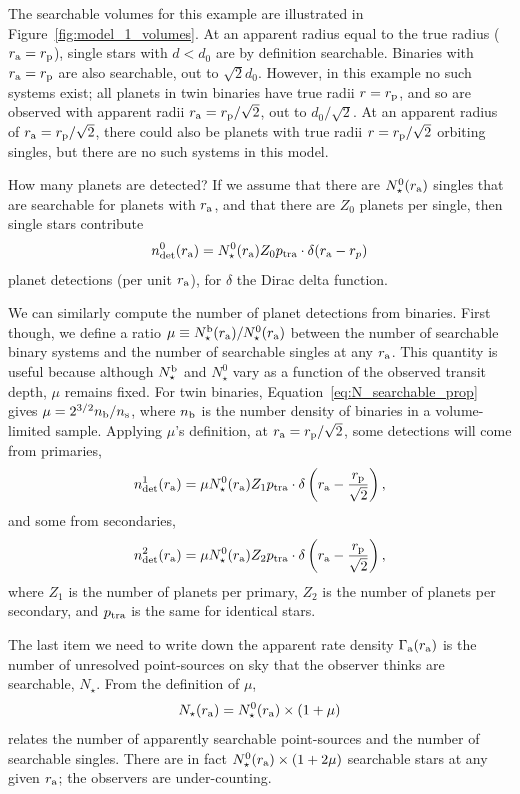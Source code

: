 \documentclass[12pt,modern]{aastex61}
\renewcommand{\a}{_{\rm a}}
\newcommand{\p}{_{\rm p}}
\begin{document}
The searchable volumes for this example are illustrated in
Figure~\ref{fig:model_1_volumes}.  At an apparent radius equal to the
true radius ($r\a=r\p$), single stars with $d<d_0$ are by definition
searchable.  Binaries with $r\a=r\p$ are also searchable, out to
$\sqrt{2}d_0$.  However, in this example no such systems exist; all
planets in twin binaries have true radii $r=r\p$, and so are observed
with apparent radii $r\a=r\p/\sqrt{2}$, out to $d_0/\sqrt{2}$.  At an
apparent radius of $r\a=r\p/\sqrt{2}$, there could also be planets
with true radii $r=r\p/\sqrt{2}$ orbiting singles, but there are no
such systems in this model.

How many planets are detected?  If we assume that there are
$N_\star^0(r\a)$ singles that are searchable for planets with $r\a$,
and that there are $Z_0$ planets per single, then single stars
contribute
\begin{equation}
n_{\rm det}^0(r\a) = 
  N_\star^0(r\a) Z_0 p_{\rm tra} \cdot \delta(r\a - r_p)
\end{equation}
planet detections (per unit $r\a$), for $\delta$ the Dirac delta
function.

We can similarly compute the number of planet detections from
binaries.  First though, we define a ratio $\mu \equiv N_\star^{\rm
b}(r\a) / N_\star^0(r\a)$ between the number of searchable binary
systems and the number of searchable singles at any $r\a$.  This
quantity is useful because although $N_\star^{\rm b}$ and $N_\star^0$
vary as a function of the observed transit depth, $\mu$ remains fixed.
For twin binaries, Equation~\ref{eq:N_searchable_prop} gives
$\mu = 2^{3/2} n_{\rm b}/n_{\rm s}$, where $n_{\rm b}$ is the number
density of binaries in a volume-limited sample.
Applying $\mu$'s definition, at $r\a=r\p/\sqrt{2}$, some detections
will come from primaries,
\begin{equation}
n_{\rm det}^1(r\a) =
    \mu N_\star^0(r\a) Z_1 p_{\rm tra}
    \cdot \delta\left(r\a - \frac{r\p}{\sqrt{2}}\right),
\end{equation}
and some from secondaries,
\begin{equation}
n_{\rm det}^2(r\a) = 
    \mu N_\star^0(r\a) Z_2 p_{\rm tra}
    \cdot \delta\left(r\a - \frac{r\p}{\sqrt{2}}\right),
\end{equation}
where $Z_1$ is the number of planets per primary, $Z_2$ is the number
of planets per secondary, and $p_{\rm tra}$ is the same for identical
stars.  

The last item we need to write down the apparent rate density
$\Gamma\a(r\a)$ is the number of unresolved point-sources on sky that
the observer thinks are searchable, $N_\star$.  From the definition of
$\mu$,
\begin{equation}
    N_\star(r\a) = N_\star^0(r\a) \times (1 + \mu)
    \label{eq:apparentlysearchable_to_searchable}
\end{equation}
relates the number of apparently searchable point-sources and the
number of searchable singles.  There are in fact $N_\star^0(r\a)\times
(1 + 2\mu)$ searchable stars at any given $r\a$; the observers are
under-counting.
\end{document}
